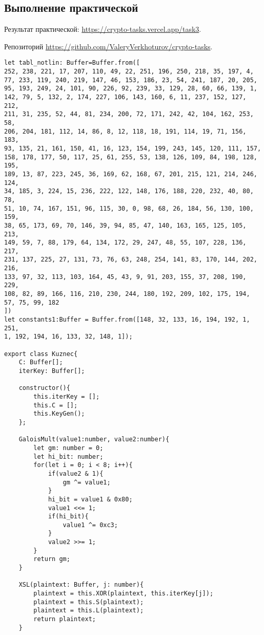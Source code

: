 \subsection{Выполнение практической}

Результат практической: \url{https://crypto-tasks.vercel.app/task3}.

Репозиторий \url{https://github.com/ValeryVerkhoturov/crypto-tasks}.

\begin{lstlisting}[caption={Шифр Магический квадрат}, label=lst:2]
let tabl_notlin: Buffer=Buffer.from([
252, 238, 221, 17, 207, 110, 49, 22, 251, 196, 250, 218, 35, 197, 4, 
77, 233, 119, 240, 219, 147, 46, 153, 186, 23, 54, 241, 187, 20, 205, 
95, 193, 249, 24, 101, 90, 226, 92, 239, 33, 129, 28, 60, 66, 139, 1, 
142, 79, 5, 132, 2, 174, 227, 106, 143, 160, 6, 11, 237, 152, 127, 212, 
211, 31, 235, 52, 44, 81, 234, 200, 72, 171, 242, 42, 104, 162, 253, 58, 
206, 204, 181, 112, 14, 86, 8, 12, 118, 18, 191, 114, 19, 71, 156, 183, 
93, 135, 21, 161, 150, 41, 16, 123, 154, 199, 243, 145, 120, 111, 157, 
158, 178, 177, 50, 117, 25, 61, 255, 53, 138, 126, 109, 84, 198, 128, 195, 
189, 13, 87, 223, 245, 36, 169, 62, 168, 67, 201, 215, 121, 214, 246, 124, 
34, 185, 3, 224, 15, 236, 222, 122, 148, 176, 188, 220, 232, 40, 80, 78, 
51, 10, 74, 167, 151, 96, 115, 30, 0, 98, 68, 26, 184, 56, 130, 100, 159, 
38, 65, 173, 69, 70, 146, 39, 94, 85, 47, 140, 163, 165, 125, 105, 213, 
149, 59, 7, 88, 179, 64, 134, 172, 29, 247, 48, 55, 107, 228, 136, 217, 
231, 137, 225, 27, 131, 73, 76, 63, 248, 254, 141, 83, 170, 144, 202, 216, 
133, 97, 32, 113, 103, 164, 45, 43, 9, 91, 203, 155, 37, 208, 190, 229, 
108, 82, 89, 166, 116, 210, 230, 244, 180, 192, 209, 102, 175, 194, 57, 75, 99, 182
])
let constants1:Buffer = Buffer.from([148, 32, 133, 16, 194, 192, 1, 251,
1, 192, 194, 16, 133, 32, 148, 1]);

export class Kuznec{
	C: Buffer[];
	iterKey: Buffer[];
	
	constructor(){
		this.iterKey = [];
		this.C = [];
		this.KeyGen();
	};
	
	GaloisMult(value1:number, value2:number){
		let gm: number = 0;
		let hi_bit: number;
		for(let i = 0; i < 8; i++){
			if(value2 & 1){
				gm ^= value1;
			}
			hi_bit = value1 & 0x80;
			value1 <<= 1;
			if(hi_bit){
				value1 ^= 0xc3;
			}
			value2 >>= 1;
		}
		return gm;
	}
	
	XSL(plaintext: Buffer, j: number){
		plaintext = this.XOR(plaintext, this.iterKey[j]);
		plaintext = this.S(plaintext);
		plaintext = this.L(plaintext);
		return plaintext;
	}
	

\end{lstlisting}
